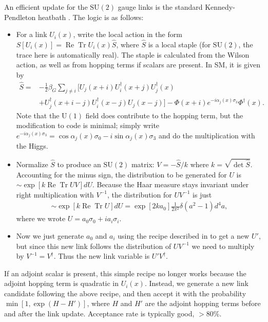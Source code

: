 \documentclass[11pt,a4paper]{article}
\newcommand\RE{\operatorname{Re}}
\newcommand\Tr{\operatorname{Tr}}
\newcommand\he[1]{#1^\dagger}%
\newcommand\gr[1]{\mathrm{#1}}%
\begin{document}
An efficient update for the $\gr{SU(2)}$ gauge links is the standard Kennedy-Pendleton heatbath \cite{Kennedy:1985nu}. The logic is as follows:
\begin{itemize}

	\item For a link $U_i(x)$, write the local action in the form $S[U_i(x)] = \RE \Tr U_i(x) \hat{S}$, where $\hat{S}$ is a local staple (for $\gr{SU(2)}$, the trace here is automatically real). The staple is calculated from the Wilson action, as well as from hopping terms if scalars are present. In SM, it is given by
\begin{align}
\hat{S} =& - \frac12 \beta_G \sum_{j \neq i} \Big[ U_j(x+i) U^\dagger_i(x+j) U^\dagger_j(x) \nonumber \\ 
 &+ U^\dagger_j(x+i-j) U^\dagger_i(x-j) U_j(x-j) \Big] - \Phi(x+i)e^{-i \alpha_j(x) \sigma_3}\he\Phi(x). 
\end{align} 
Note that the $\gr{U(1)}$ field does contribute to the hopping term, but the modification to code is minimal; simply write $e^{-i \alpha_j(x) \sigma_3} = \cos \alpha_j(x) \sigma_0 - i \sin\alpha_j(x) \sigma_3$ and do the multiplication with the Higgs.

	\item Normalize $\hat{S}$ to produce an $\gr{SU(2)}$ matrix: $V = -\hat{S} /k$ where $k = \sqrt{\det \hat{S}}$. Accounting for the minus sign, the distribution to be generated for $U$ is $\sim \exp[k \RE\Tr U V] dU$. Because the Haar measure stays invariant under right multiplication with $V^{-1}$, the distribution for $U V^{-1}$ is just 
\begin{align}
\sim \exp[k \RE\Tr U] dU = \exp[2 k a_0] \frac{1}{2\pi^2} \delta(a^2-1) d^4 a,
\end{align}
where we wrote $U = a_0 \sigma_0 + i a_i \sigma_i$.

	\item Now we just generate $a_0$ and $a_i$ using the recipe described in \cite{Kennedy:1985nu} to get a new $U'$, but since this new link follows the distribution of $U V^{-1}$ we need to multiply by $V^{-1} = \he V$. Thus the new link variable is $U' \he V$.

\end{itemize}


If an adjoint scalar is present, this simple recipe no longer works because the adjoint hopping term is quadratic in $U_i(x)$. Instead, we generate a new link candidate following the above recipe, and then accept it with the probability $\min[1, \exp(H - H')]$, where $H$ and $H'$ are the adjoint hopping terms before and after the link update. Acceptance rate is typically good, $>80\%$.
\end{document}
